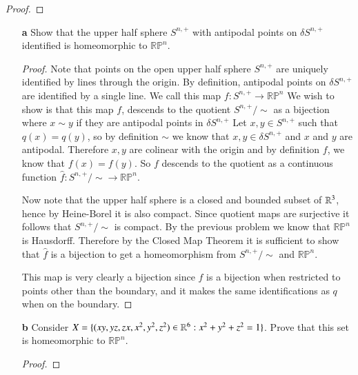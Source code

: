 \documentclass{homework651}
\begin{document}
\begin{problems}
\begin{proof}
    
\end{proof}







\problem 
\begin{enumerate}
    \item[\textbf{a}] Show that the upper half sphere $S^{n, +}$ with antipodal points on $\delta S^{n, +}$
    identified is homeomorphic to $\mathbb{R}\mathbb{P}^n$.
    \begin{proof} Note that points on the open upper half sphere $S^{n, +}$ are uniquely identified by lines through the 
        origin. By definition, antipodal points on $\delta S^{n, +}$ are identified by a single line. We call this map $f: S^{n, +} \to \mathbb{R}\mathbb{P}^n$
        We wish to show is that this map $f$, descends to the quotient $S^{n, +}/\sim$ as a bijection where $x \sim y$ if they are antipodal points in $\delta S^{n, +}$
        Let $x, y \in S^{n, +}$ such that $q(x) = q(y)$, so by definition $\sim$ we know that $x, y \in \delta S^{n, +}$
        and $x$ and $y$ are antipodal. Therefore $x, y$ are colinear with the origin and by definition $f$, we know that $f(x) = f(y)$. So $f$ descends to the quotient as a continuous function $\hat{f}: S^{n, +}/\sim \to \mathbb{R}\mathbb{P}^n$. 

        Now note that the upper half sphere is a closed and bounded subset of $\RR^3$, hence by Heine-Borel it is also compact. 
        Since quotient maps are surjective it follows that $S^{n, +}/\sim$ is compact. By the previous problem we know that $\mathbb{R}\mathbb{P}^n$ is 
        Hausdorff. Therefore by the Closed Map Theorem it is sufficient to show that $\hat{f}$ is a bijection to get a homeomorphism from $ S^{n, +}/\sim$ and $\mathbb{R}\mathbb{P}^n$.

        This map is very clearly a bijection since $f$ is a bijection when restricted to points other than the boundary, and it makes 
        the same identifications as $q$ when on the boundary. 
    \end{proof}


    \item[\textbf{b}] Consider $X = \{(xy, yz, zx, x^2, y^2, z^2) \in \RR^6: x^2 + y^2 + z^2 = 1\}$. 
    Prove that this set is homeomorphic to $\mathbb{R}\mathbb{P}^n$. 
    \begin{proof}
        
    \end{proof}
\end{enumerate}





\end{problems}
\end{document}
